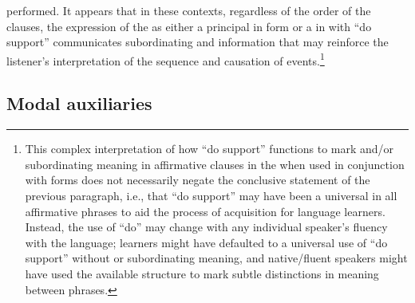 performed. It appears that in these contexts, regardless of the order of the clauses, the expression of the  as either a principal  in  form or a  in  with “do support” communicates subordinating and  information that may reinforce the listener’s interpretation of the sequence and causation of events.\footnote{This complex interpretation of how “do support” functions to mark  and/or subordinating meaning in affirmative clauses in the  when used in conjunction with  forms does not necessarily negate the conclusive statement of the previous paragraph, i.e., that “do support” may have been a universal in all affirmative  phrases to aid the process of acquisition for language learners. Instead, the use of “do” may change with any individual speaker’s fluency with the language; learners might have defaulted to a universal use of “do support” without  or subordinating meaning, and native/fluent speakers might have used the available structure to mark subtle distinctions in meaning between  phrases.}   

\subsection{{Modal auxiliaries}}\label{sec:6.4.3}

